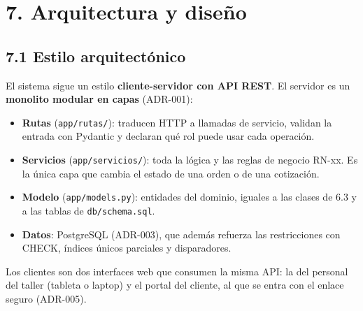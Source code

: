 \section{7. Arquitectura y diseño}\label{arquitectura-y-diseuxf1o}

\subsection{7.1 Estilo arquitectónico}\label{estilo-arquitectuxf3nico}

El sistema sigue un estilo \textbf{cliente-servidor con API REST}. El servidor es un \textbf{monolito
modular en capas} (ADR-001):

\begin{itemize}
\tightlist
\item \textbf{Rutas} (\texttt{app/rutas/}): traducen HTTP a llamadas de servicio, validan la entrada con
Pydantic y declaran qué rol puede usar cada operación.
\item \textbf{Servicios} (\texttt{app/servicios/}): toda la lógica y las reglas de negocio RN-xx. Es la
única capa que cambia el estado de una orden o de una cotización.
\item \textbf{Modelo} (\texttt{app/models.py}): entidades del dominio, iguales a las clases de 6.3 y a las
tablas de \texttt{db/schema.sql}.
\item \textbf{Datos}: PostgreSQL (ADR-003), que además refuerza las restricciones con CHECK, índices únicos
parciales y disparadores.
\end{itemize}

Los clientes son dos interfaces web que consumen la misma API: la del personal del taller (tableta o
laptop) y el portal del cliente, al que se entra con el enlace seguro (ADR-005).

